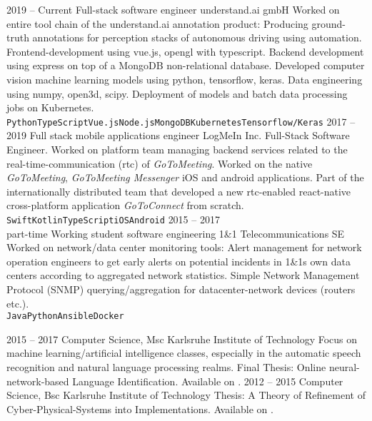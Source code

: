 \documentclass[8pt]{developercv} %
\begin{document}
\begin{entrylist}
	\entry
		{2019 -- Current}
		{Full-stack software engineer}
		{understand.ai gmbH}
		{Worked on entire tool chain of the understand.ai annotation product: Producing ground-truth annotations for perception stacks of autonomous driving using automation. Frontend-development using vue.js, opengl with typescript. Backend development using express on top of a MongoDB non-relational database. Developed computer vision machine learning models using python, tensorflow, keras. Data engineering using numpy, open3d, scipy. Deployment of models and batch data processing jobs on Kubernetes. \\ \texttt{Python}\slashsep\texttt{TypeScript}\slashsep\texttt{Vue.js}\slashsep\texttt{Node.js}\slashsep\texttt{MongoDB}\slashsep\texttt{Kubernetes}\slashsep\texttt{Tensorflow/Keras}}
	\entry
		{2017 -- 2019}
		{Full stack mobile applications engineer}
		{LogMeIn Inc.}
		{Full-Stack Software Engineer. Worked on platform team managing backend services related to the real-time-communication (rtc) of \textit{GoToMeeting}. Worked on the native \textit{GoToMeeting}, \textit{GoToMeeting Messenger} iOS and android applications. Part of the internationally distributed team that developed a new rtc-enabled react-native cross-platform application \textit{GoToConnect} from scratch. \texttt{Swift}\slashsep\texttt{Kotlin}\slashsep\texttt{TypeScript}\slashsep\texttt{iOS}\slashsep\texttt{Android}}
	\entry
		{2015 -- 2017\\\footnotesize{part-time}}
		{Working student software engineering}
		{1\&1 Telecommunications SE}
		{Worked on network/data center monitoring tools: Alert management for network operation engineers to get early alerts on potential incidents in 1\&1s own data centers according to aggregated network statistics. Simple Network Management Protocol (SNMP) querying/aggregation for datacenter-network devices (routers etc.).
		 \\ \texttt{Java}\slashsep\texttt{Python}\slashsep\texttt{Ansible}\slashsep\texttt{Docker}}
\end{entrylist}



\begin{entrylist}
	\entry
		{2015 -- 2017}
		{Computer Science, Msc}
		{Karlsruhe Institute of Technology}
		{Focus on machine learning/artificial intelligence classes, especially in the automatic speech recognition and natural language processing realms. Final Thesis: Online neural-network-based Language Identification. Available on .}
	\entry
		{2012 -- 2015}
		{Computer Science, Bsc}
		{Karlsruhe Institute of Technology}
		{Thesis: A Theory of Refinement of Cyber-Physical-Systems into Implementations. Available on .}
\end{entrylist}
\end{document}
